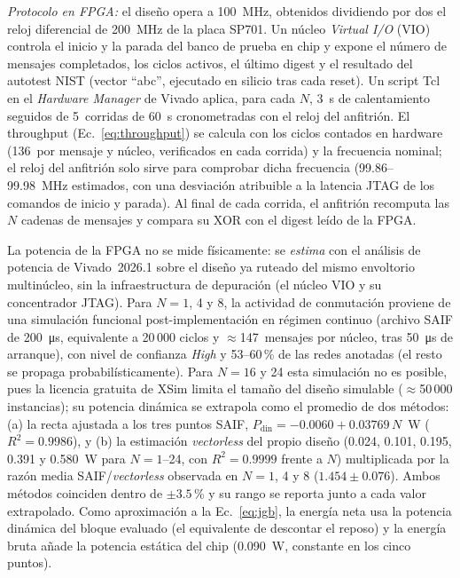 \documentclass[conference]{IEEEtran}
\begin{document}
\textit{Protocolo en FPGA:} el diseño opera a 100~MHz, obtenidos dividiendo por dos el reloj diferencial de 200~MHz de la placa SP701. Un núcleo \textit{Virtual I/O} (VIO) controla el inicio y la parada del banco de prueba en chip y expone el número de mensajes completados, los ciclos activos, el último digest y el resultado del autotest NIST (vector ``abc'', ejecutado en silicio tras cada reset). Un script Tcl en el \textit{Hardware Manager} de Vivado aplica, para cada $N$, 3~s de calentamiento seguidos de 5~corridas de 60~s cronometradas con el reloj del anfitrión. El throughput (Ec.~\ref{eq:throughput}) se calcula con los ciclos contados en hardware (136~por mensaje y núcleo, verificados en cada corrida) y la frecuencia nominal; el reloj del anfitrión solo sirve para comprobar dicha frecuencia (99.86--99.98~MHz estimados, con una desviación atribuible a la latencia JTAG de los comandos de inicio y parada). Al final de cada corrida, el anfitrión recomputa las $N$ cadenas de mensajes y compara su XOR con el digest leído de la FPGA.

La potencia de la FPGA no se mide físicamente: se \emph{estima} con el análisis de potencia de Vivado~2026.1 sobre el diseño ya ruteado del mismo envoltorio multinúcleo, sin la infraestructura de depuración (el núcleo VIO y su concentrador JTAG). Para $N=1$, 4 y 8, la actividad de conmutación proviene de una simulación funcional post-implementación en régimen continuo (archivo SAIF de 200~\si{\micro\second}, equivalente a 20\,000 ciclos y $\approx$147~mensajes por núcleo, tras 50~\si{\micro\second} de arranque), con nivel de confianza \textit{High} y 53--60\,\% de las redes anotadas (el resto se propaga probabilísticamente). Para $N=16$ y 24 esta simulación no es posible, pues la licencia gratuita de XSim limita el tamaño del diseño simulable ($\approx$50\,000 instancias); su potencia dinámica se extrapola como el promedio de dos métodos: (a) la recta ajustada a los tres puntos SAIF, $P_\text{din} = -0.0060 + 0.03769\,N$~W ($R^2 = 0.9986$), y (b) la estimación \textit{vectorless} del propio diseño (0.024, 0.101, 0.195, 0.391 y 0.580~W para $N = 1$--24, con $R^2 = 0.9999$ frente a $N$) multiplicada por la razón media SAIF/\textit{vectorless} observada en $N = 1$, 4 y 8 ($1.454 \pm 0.076$). Ambos métodos coinciden dentro de $\pm 3.5$\,\% y su rango se reporta junto a cada valor extrapolado. Como aproximación a la Ec.~\ref{eq:jgb}, la energía neta usa la potencia dinámica del bloque evaluado (el equivalente de descontar el reposo) y la energía bruta añade la potencia estática del chip (0.090~W, constante en los cinco puntos).
\end{document}
